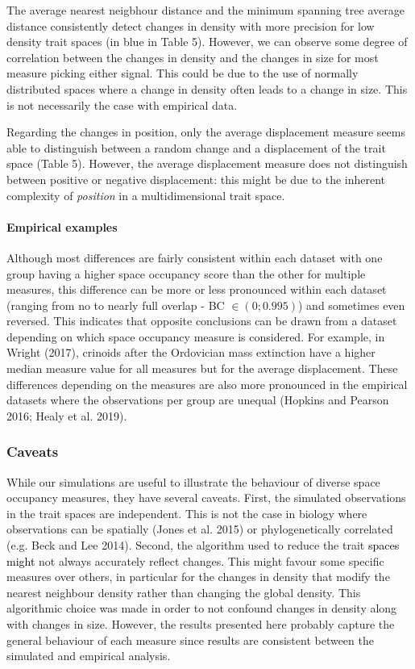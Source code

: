 \documentclass[]{article}
\let\oldparagraph\paragraph
\renewcommand{\paragraph}[1]{\oldparagraph{#1}\mbox{}}
\begin{document}
The average nearest neigbhour distance and the minimum spanning tree
average distance consistently detect changes in density with more
precision for low density trait spaces (in blue in Table 5). However, we
can observe some degree of correlation between the changes in density
and the changes in size for most measure picking either signal. This
could be due to the use of normally distributed spaces where a change in
density often leads to a change in size. This is not necessarily the
case with empirical data.

Regarding the changes in position, only the average displacement measure
seems able to distinguish between a random change and a displacement of
the trait space (Table 5). However, the average displacement measure
does not distinguish between positive or negative displacement: this
might be due to the inherent complexity of \emph{position} in a
multidimensional trait space.

\paragraph{Empirical examples}\label{empirical-examples-1}

Although most differences are fairly consistent within each dataset with
one group having a higher space occupancy score than the other for
multiple measures, this difference can be more or less pronounced within
each dataset (ranging from no to nearly full overlap - BC
\(\in(0;0.995)\)) and sometimes even reversed. This indicates that
opposite conclusions can be drawn from a dataset depending on which
space occupancy measure is considered. For example, in Wright (2017),
crinoids after the Ordovician mass extinction have a higher median
measure value for all measures but for the average displacement. These
differences depending on the measures are also more pronounced in the
empirical datasets where the observations per group are unequal (Hopkins
and Pearson 2016; Healy et al. 2019).

\subsubsection{Caveats}\label{caveats}

While our simulations are useful to illustrate the behaviour of diverse
space occupancy measures, they have several caveats. First, the
simulated observations in the trait spaces are independent. This is not
the case in biology where observations can be spatially (Jones et al.
2015) or phylogenetically correlated (e.g. Beck and Lee 2014). Second,
the algorithm used to reduce the trait
\textcolor{black}{ spaces might } not always
accurately reflect changes. This might favour some specific measures
over others, in particular for the changes in density that modify the
nearest neighbour density rather than changing the global density. This
algorithmic choice was made in order to not confound changes in density
along with changes in size. However, the results presented here probably
capture the general behaviour of each measure since results are
consistent between the simulated and empirical analysis.
\end{document}
